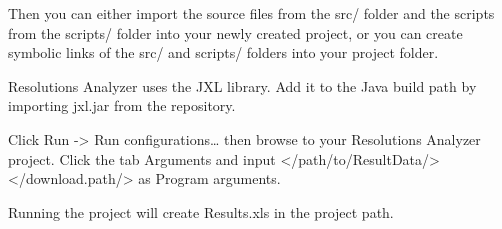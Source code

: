 Then you can either import the source files from the src/ folder and the scripts from the scripts/ folder into your newly created project, or you can create symbolic links of the src/ and scripts/ folders into your project folder.

Resolutions Analyzer uses the JXL library. Add it to the Java build path by importing jxl.jar from the repository.

Click Run -> Run configurations… then browse to your Resolutions Analyzer project. Click the tab Arguments and input </path/to/ResultData/> </download.path/> as Program arguments.

Running the project will create Results.xls in the project path.

